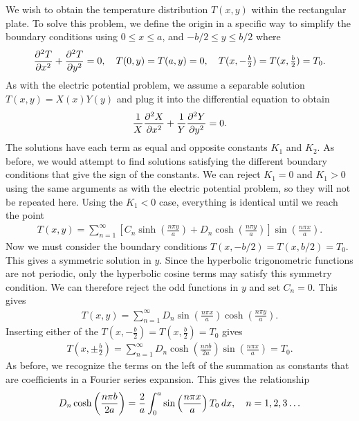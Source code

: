 We wish to obtain the temperature distribution $T(x,y)$ within the rectangular plate. To solve this problem, we define the origin in a specific way to simplify the boundary conditions using $0 \le x \le a$, and $-b/2 \le y \le b/2$ where
\begin{align}
  \frac{ \partial^2 {T} }{ \partial {x}^2 } + \frac{ \partial^2 {T} }{ \partial {y}^2 } = 0 , \quad T(0,y) = T(a,y) = 0, \quad T(x,-\tfrac{b}{2}) = T(x,\tfrac{b}{2}) = T_0 .
\end{align}
As with the electric potential problem, we assume a separable solution $T(x,y) = X(x) Y(y)$ and plug it into the differential equation to obtain
\begin{align}
  \frac{1}{X} \frac{ \partial^2 {X} }{ \partial {x}^2 } + \frac{1}{Y} \frac{ \partial^2 {Y} }{ \partial {y}^2 } = 0. \nonumber
\end{align}
The solutions have each term as equal and opposite constants $K_1$ and $K_2$. As before, we would attempt to find solutions satisfying the different boundary conditions that give the sign of the constants. We can reject $K_1 = 0$ and $K_1 > 0$ using the same arguments as with the electric potential problem, so they will not be repeated here. Using the $K_1 < 0$ case, everything is identical until we reach the point
\begin{align}
  T(x,y) = \sum_{n=1}^\infty  \left[ C_n \sinh \left( \frac{n\pi y}{a} \right) + D_n \cosh \left( \frac{n\pi y}{a} \right) \right] \sin \left( \frac{n\pi x}{a} \right) .
\end{align}
Now we must consider the boundary conditions $T(x,-b/2) = T(x,b/2) = T_0$. This gives a symmetric solution in $y$. Since the hyperbolic trigonometric functions are not periodic, only the hyperbolic cosine terms may satisfy this symmetry condition. We can therefore reject the odd functions in $y$ and set $C_n = 0$. This gives
\begin{align}
  T(x,y) = \sum_{n=1}^\infty  D_n \sin \left( \frac{n\pi x}{a} \right) \cosh \left( \frac{n\pi y}{a} \right)  .
\end{align}
Inserting either of the $T(x,-\tfrac{b}{2}) = T(x,\tfrac{b}{2}) = T_0$ gives
\begin{align}
  T(x,\pm \tfrac{b}{2}) = \sum_{n=1}^\infty  D_n \cosh \left( \frac{n\pi b}{2 a} \right) \sin \left( \frac{n\pi x}{a} \right) = T_0  .
\end{align}
As before, we recognize the terms on the left of the summation as constants that are coefficients in a Fourier series expansion. This gives the relationship
\begin{align}
  D_n \cosh \left( \frac{n\pi b}{2 a} \right) = \frac{2}{a} \int_0^a \sin \left( \frac{n\pi x}{a} \right) T_0 \hspace{0.2em} dx ,  \quad n = 1, 2, 3 \ldots 
\end{align}
